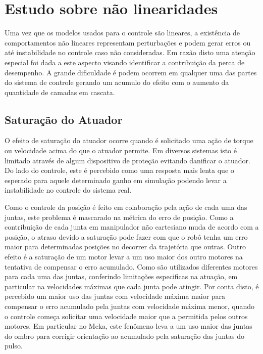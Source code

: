 
\section{Estudo sobre não linearidades}


Uma vez que os modelos usados para o controle são lineares, a existência de comportamentos não lineares representam perturbações e podem gerar erros ou até instabilidade no controle caso não consideradas. Em razão disto uma atenção especial foi dada a este aspecto visando identificar a contribuição da perca de desempenho. A grande dificuldade é podem ocorrem em qualquer uma das partes do sistema de controle gerando um acumulo do efeito com o aumento da quantidade de camadas em cascata.

\subsection{Saturação do Atuador}

O efeito de saturação do atuador ocorre quando é solicitado uma ação de torque ou velocidade acima do que o atuador permite. Em diversos sistemas isto é limitado através de algum dispositivo de proteção evitando danificar o atuador. Do lado do controle, este é percebido como uma resposta mais lenta que o esperado para aquele determinado ganho em simulação podendo levar a instabilidade no controle do sistema real.

Como o controle da posição é feito em colaboração pela ação de cada uma das juntas, este problema é mascarado na métrica do erro de posição. Como a contribuição de cada junta em manipulador não cartesiano muda de acordo com a posição, o atraso devido a saturação pode fazer com que o robô tenha um erro maior para determinadas posições no decorrer da trajetória que outras. Outro efeito é a saturação de um motor levar a um uso maior dos outro motores na tentativa de compensar o erro acumulado. Como são utilizados diferentes motores para cada uma das juntas, conferindo limitações especificas na atuação, em particular na velocidades máximas que cada junta pode atingir. Por conta disto, é percebido um maior uso das juntas com velocidade máxima maior para compensar o erro acumulado pela juntas com velocidade máxima menor, quando o controle começa solicitar uma velocidade maior que a permitida pelos outros motores. Em particular no Meka, este fenômeno leva a um uso maior das juntas do ombro para corrigir orientação ao acumulado pela saturação das juntas do pulso.


